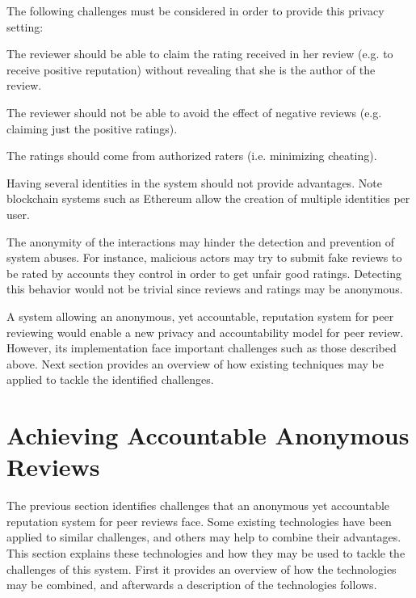 The following challenges must be considered in order to provide this privacy
setting:
\begin{enumerate}

  \label{ch:anonymity} The reviewer should be able to claim the
  rating received in her review (e.g. to receive positive reputation) without
  revealing that she is the author of the review.

   \label{ch:accountability} The reviewer should not be
  able to avoid the effect of negative reviews (e.g. claiming just the positive
  ratings).
  

   \label{ch:authorization} The ratings should come from
  authorized raters (i.e. minimizing cheating).


   \label{ch:sybil} Having several identities in the
  system should not provide advantages. Note blockchain systems such as Ethereum
  allow the creation of multiple identities per user.


   \label{ch:abuses} The anonymity of the interactions may
  hinder the detection and prevention of system abuses. For instance, malicious
  actors may try to submit fake reviews to be rated by accounts they control in
  order to get unfair good ratings. Detecting this behavior would not be trivial
  since reviews and ratings may be anonymous.

\end{enumerate}

A system allowing an anonymous, yet accountable, reputation system for peer
reviewing would enable a new privacy and accountability model for peer review.
However, its implementation face important challenges such as those described
above. Next section provides an overview of how existing techniques may be
applied to tackle the identified
challenges. %

\section{Achieving Accountable Anonymous Reviews}\label{sec:realizing}

The previous section identifies challenges that an anonymous yet accountable
reputation system for peer reviews face. Some existing technologies have been
applied to similar challenges, and others may help to combine their advantages.
This section explains these technologies and how they may be used to tackle the
challenges of this system. First it provides an overview of how the technologies
may be combined, and afterwards a description of the technologies follows.

